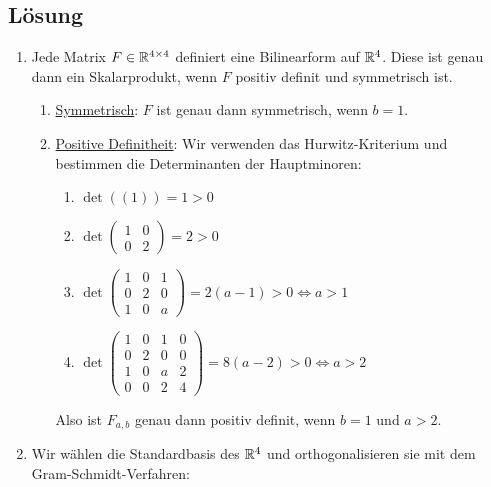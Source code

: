 \subsection{Lösung}
\begin{enumerate}
	\item Jede Matrix \( F \in \mathbb{R}^{4 \times 4} \) definiert eine Bilinearform auf \( \mathbb{R}^4 \). Diese ist genau dann ein Skalarprodukt, wenn \( F \) positiv definit und symmetrisch ist.
		\begin{enumerate}
			\item \underline{Symmetrisch}: \( F \) ist genau dann symmetrisch, wenn \( b = 1 \).
			\item \underline{Positive Definitheit}: Wir verwenden das Hurwitz-Kriterium und bestimmen die Determinanten der Hauptminoren:
				\begin{enumerate}
				 	\item \( \det((1)) = 1 > 0 \)
				 	\item \( \det\left( \begin{smallmatrix}
				 		1 & 0 \\
				 		0 & 2
				 	\end{smallmatrix} \right) = 2 > 0 \) 
				 	\item \( \det\left( \begin{smallmatrix}
				 		1 & 0 & 1 \\
				 		0 & 2 & 0 \\
				 		1 & 0 & a
				 	\end{smallmatrix} \right) = 2(a-1) > 0 \Leftrightarrow a > 1 \)
				 	\item \( \det\left( \begin{smallmatrix}
				 		1 & 0 & 1 & 0 \\
				 		0 & 2 & 0 & 0 \\
				 		1 & 0 & a & 2 \\
				 		0 & 0 & 2 & 4
				 	\end{smallmatrix} \right) = 8(a-2) > 0 \Leftrightarrow a > 2 \)
				 \end{enumerate} 
				 Also ist \( F_{a,b} \) genau dann positiv definit, wenn \( b = 1 \) und \( a > 2 \).
		\end{enumerate}
	\item Wir wählen die Standardbasis des \( \mathbb{R}^4 \) und orthogonalisieren sie mit dem Gram-Schmidt-Verfahren:
\end{enumerate}
